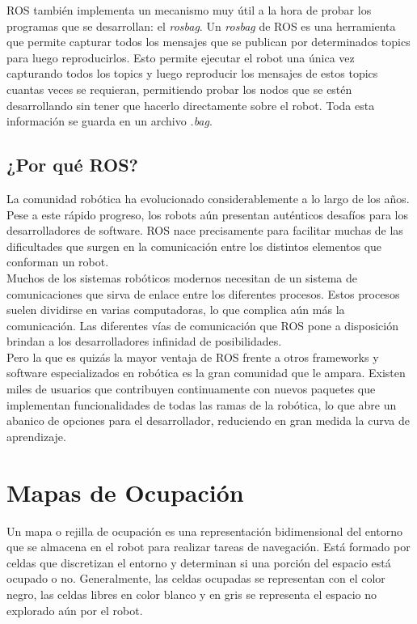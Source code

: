 ROS también implementa un mecanismo muy útil a la hora de probar los programas que se desarrollan: el \textit{rosbag}. Un \textit{rosbag} de ROS es una herramienta que permite capturar todos los mensajes que se publican por determinados topics para luego reproducirlos. Esto permite ejecutar el robot una única vez capturando todos los topics y luego reproducir los mensajes de estos topics cuantas veces se requieran, permitiendo probar los nodos que se estén desarrollando sin tener que hacerlo directamente sobre el robot. Toda esta información se guarda en un archivo \textit{.bag}. \cite{roswiki}\\

\subsection{¿Por qué ROS?}

La comunidad robótica ha evolucionado considerablemente a lo largo de los años. Pese a  este rápido progreso, los robots aún presentan auténticos desafíos para los desarrolladores de software. ROS nace precisamente para facilitar muchas de las dificultades que surgen en la comunicación entre los distintos elementos que conforman un robot.\\

Muchos de los sistemas robóticos modernos necesitan de un sistema de comunicaciones que sirva de enlace entre los diferentes procesos. Estos procesos suelen dividirse en varias computadoras, lo que complica aún más la comunicación. Las diferentes vías de comunicación que ROS pone a disposición brindan a los desarrolladores infinidad de posibilidades.\\

Pero la que es quizás la mayor ventaja de ROS frente a otros frameworks y software especializados en robótica es la gran comunidad que le ampara. Existen miles de usuarios que contribuyen continuamente con nuevos paquetes que implementan funcionalidades de todas las ramas de la robótica, lo que abre un abanico de opciones para el desarrollador, reduciendo en gran medida la curva de aprendizaje.\\

\section{Mapas de Ocupación}

Un mapa o rejilla de ocupación es una representación bidimensional del entorno que se almacena en el robot para realizar tareas de navegación. Está formado por celdas que discretizan el entorno y determinan si una porción del espacio está ocupado o no. Generalmente, las celdas ocupadas se representan con el color negro, las celdas libres en color blanco y en gris se representa el espacio no explorado aún por el robot.\\

